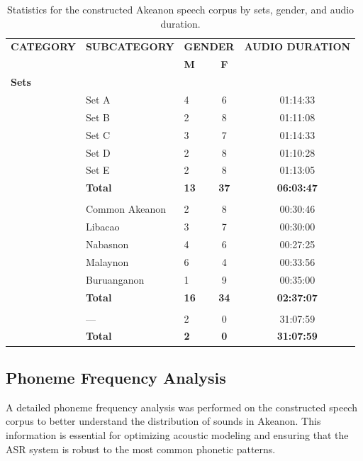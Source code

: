 \begin{table}[H]
	\centering
	\begin{adjustbox}{width=0.95\textwidth}
		\begin{tabular}{lllcc}
			\toprule
			\textbf{CATEGORY} & \textbf{SUBCATEGORY} & \multicolumn{2}{c}{\textbf{GENDER}} & \textbf{AUDIO DURATION} \\
			\cmidrule(lr){3-4}
			& & \textbf{M} & \textbf{F} & \\
			\midrule
			\multicolumn{5}{l}{\textbf{Sets}} \\
			& Set A & 4 & 6 & 01:14:33 \\
			& Set B & 2 & 8 & 01:11:08 \\
			& Set C & 3 & 7 & 01:14:33 \\
			& Set D & 2 & 8 & 01:10:28 \\
			& Set E & 2 & 8 & 01:13:05 \\
			\addlinespace
			& \textbf{Total} & \textbf{13} & \textbf{37} & \textbf{06:03:47} \\
			\addlinespace
			\multicolumn{5}{l}{\textbf{Dialects}} \\
			& Common Akeanon & 2 & 8 & 00:30:46 \\
			& Libacao          & 3 & 7 & 00:30:00 \\
			& Nabasnon         & 4 & 6 & 00:27:25 \\
			& Malaynon         & 6 & 4 & 00:33:56 \\
			& Buruanganon      & 1 & 9 & 00:35:00 \\
			\addlinespace
			& \textbf{Total} & \textbf{16} & \textbf{34} & \textbf{02:37:07} \\
			\addlinespace
			\multicolumn{5}{l}{\textbf{Bible}} \\
			& — & 2 & 0 & 31:07:59 \\
			\addlinespace
			& \textbf{Total} & \textbf{2} & \textbf{0} & \textbf{31:07:59} \\
			\bottomrule
		\end{tabular}
	\end{adjustbox}
	\caption{Statistics for the constructed Akeanon speech corpus by sets, gender, and audio duration.}
	\label{tab:bikolano_stats}
\end{table}

\subsection{Phoneme Frequency Analysis}
A detailed phoneme frequency analysis was performed on the constructed speech corpus to better understand the distribution of sounds in Akeanon. This information is essential for optimizing acoustic modeling and ensuring that the ASR system is robust to the most common phonetic patterns.

